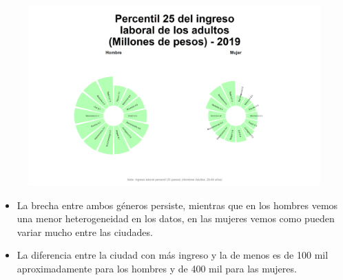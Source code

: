     \begin{figure}[H]
        \caption[Percentil 25 del ingreso laboral de los adultos por ciudades por género para 2019 ]{\label{inglab25adu_gen_ciudad_static} }
        \begin{center}
        \includegraphics[width=\textwidth,keepaspectratio]{img/var_6_static.png}
        \end{center}
    \end{figure}
            \begin{itemize}
                \item La brecha entre ambos géneros persiste, mientras que en los hombres vemos una menor heterogeneidad en los datos, en las mujeres vemos como pueden variar mucho entre las ciudades.
                \item La diferencia entre la ciudad con más ingreso y la de menos es de 100 mil aproximadamente para los hombres y de 400 mil para las mujeres.
                \end{itemize}

